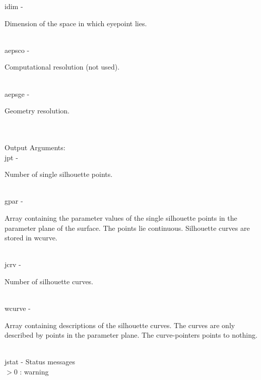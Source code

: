         \>\>    {\fov idim}\> - \>  \begin{minipg2}
                        Dimension of the space in which eyepoint lies.
                               \end{minipg2}\\
        \>\>    {\fov aepsco}\> - \>  \begin{minipg2}
                        Computational resolution (not used).
                               \end{minipg2}\\
        \>\>    {\fov aepsge}\> - \>  \begin{minipg2}
                        Geometry resolution.
                               \end{minipg2}\\
\\
        \>Output Arguments:\\
        \>\>    {\fov jpt}\> - \>  \begin{minipg2}
                     Number of single silhouette points.
                               \end{minipg2}\\
        \>\>    {\fov gpar}\> - \>  \begin{minipg2}
                     Array containing the parameter values of the
                       single silhouette points in the parameter
                       plane of the surface. The points lie continuous.
                       Silhouette curves are stored in wcurve.
                               \end{minipg2}\\[0.8ex]
        \>\>    {\fov jcrv}\> - \>  \begin{minipg2}
                     Number of silhouette curves.
                               \end{minipg2}\\
        \>\>    {\fov wcurve}\> - \>  \begin{minipg2}
                     Array containing descriptions of the silhouette
                       curves. The curves are only described by points
                       in the parameter plane. The curve-pointers points
                       to nothing.
                               \end{minipg2}\\[0.8ex]
        \>\>    {\fov jstat}     \> - \> Status messages\\
                \>\>\>\>\>              $> 0$   : warning\\
